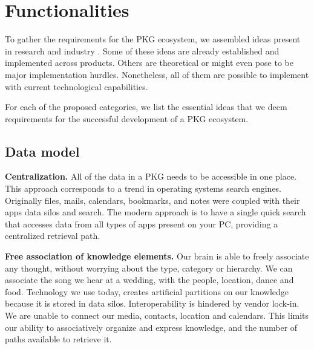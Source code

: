 

\section{Functionalities}

To gather the requirements for the PKG ecosystem, we assembled ideas present in research and industry \cite{Bush1945Memex, Davies2005Memex60, Matuschak2019TTFT,jones2007PIM}. Some of these ideas are already established and implemented across products. Others are theoretical or might even pose to be major implementation hurdles. Nonetheless, all of them are possible to implement with current technological capabilities.

For each of the proposed categories, we list the essential ideas that we deem requirements for the successful development of a PKG ecosystem.

\subsection*{Data model}

\textbf{Centralization.} All of the data in a PKG needs to be accessible in one place. This approach corresponds to a trend in operating systems search engines. Originally files, mails, calendars, bookmarks, and notes were coupled with their apps data silos and search. The modern approach is to have a single quick search that accesses data from all types of apps present on your PC, providing a centralized retrieval path.

\textbf{Free association of knowledge elements.} Our brain is able to freely associate any thought, without worrying about the type, category or hierarchy. We can associate the song we hear at a wedding, with the people, location, dance and food. Technology we use today, creates artificial partitions on our knowledge because it is stored in data silos. Interoperability is hindered by vendor lock-in. We are unable to connect our media, contacts, location and calendars. This limits our ability to associatively organize and express knowledge, and the number of paths available to retrieve it.

